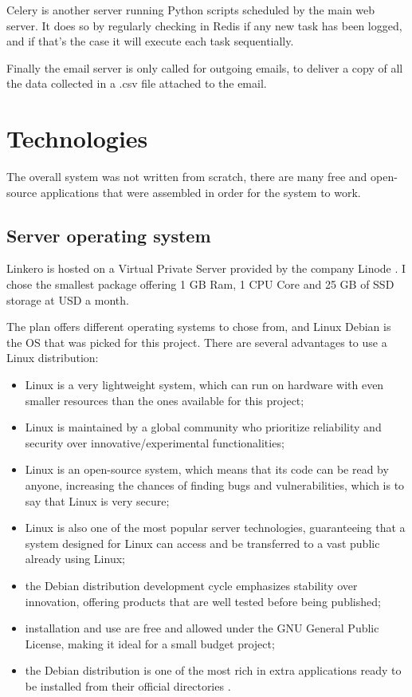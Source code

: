 Celery is another server running Python scripts scheduled by the main web
server. It does so by regularly checking in Redis if any new task has been
logged, and if that's the case it will execute each task sequentially.

Finally the email server is only called for outgoing emails, to deliver a copy
of all the data collected in a .csv file attached to the email.

\section{Technologies}

The overall system was not written from scratch, there are many free and
open-source applications that were assembled in order for the system to work.

\subsection{Server operating system}
Linkero is hosted on a Virtual Private Server provided by the company Linode
\texttrademark. I chose the smallest package offering 1 GB Ram, 1 CPU Core and
25 GB of SSD storage at  USD a month.

The plan offers different operating systems to chose from, and Linux Debian is
the OS that was picked for this project. There are several advantages to use a
Linux distribution:
\begin{itemize}
  \item Linux is a very lightweight system, which can run on hardware with even
  smaller resources than the ones available for this project;
  \item Linux is maintained by a global community who prioritize reliability and
  security over innovative/experimental functionalities;
  \item Linux is an open-source system, which means that its code can be read by
  anyone, increasing the chances of finding bugs and vulnerabilities, which is
  to say that Linux is very secure;
  \item Linux is also one of the most popular server technologies, guaranteeing
  that a system designed for Linux can access and be transferred to a vast
  public already using Linux;
  \item the Debian distribution development cycle emphasizes stability over
  innovation, offering products that are well tested before being published;
  \item installation and use are free and allowed under the GNU General Public
  License, making it ideal for a small budget project;
  \item the Debian distribution is one of the most rich in extra applications
  ready to be installed from their official directories \cite{Debian}.
\end{itemize}

